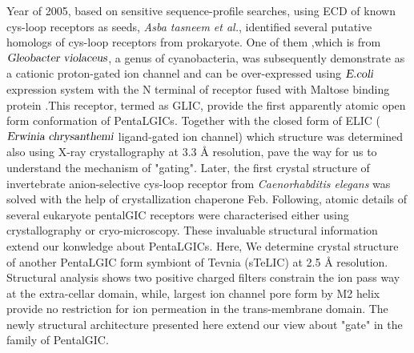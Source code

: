 \documentclass[12pt,a4paper,]{article}
\begin{document}
Year of 2005, based on sensitive sequence-profile searches, using ECD of known cys-loop receptors as seeds,  \textsl{Asba tasneem et al.}, identified several putative homologs of cys-loop receptors from prokaryote.
One of them ,which is  from $\textsl{Gleobacter violaceus}$, a genus of cyanobacteria, was subsequently demonstrate as a cationic proton-gated ion channel and can be over-expressed using $\textsl{E.coli}$ expression system with the N terminal of receptor fused with Maltose binding protein \cite{boc07}.This receptor,  termed as GLIC, provide the first apparently atomic open form conformation of PentaLGICs\cite{hilf2009structure}. Together with the closed form of ELIC ($\textsl{Erwinia chrysanthemi}$ ligand-gated ion channel) which structure was determined also using X-ray crystallography at 3.3 \AA{} \cite{hilf2008x} resolution, pave the way for us to understand the mechanism of "gating". Later, the first crystal structure of invertebrate anion-selective cys-loop receptor from \textsl{Caenorhabditis elegans} was solved with the help of  crystallization chaperone Feb. Following, atomic details of several eukaryote pentalGIC receptors were characterised either using crystallography or cryo-microscopy. These invaluable structural information extend our konwledge about PentaLGICs. Here, We determine crystal structure of another PentaLGIC form symbiont of Tevnia (sTeLIC) at 2.5 \AA{} resolution. Structural analysis shows two positive charged filters constrain the ion pass way at the extra-cellar domain, while, largest ion channel pore form by M2 helix provide no restriction for ion permeation in the trans-membrane domain. The newly structural architecture  presented here extend our view about "gate" in the family of PentalGIC.
 
 
	
	
\end{document}
